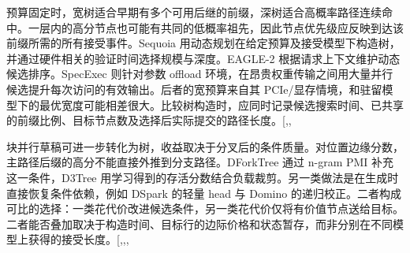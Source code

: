 \documentclass[
  a4paper,
  UTF8,
  fontset=none,
  zihao=5]{ctexart}
\begin{document}
预算固定时，宽树适合早期有多个可用后继的前缀，深树适合高概率路径连续命中。一层内的高分节点也可能有共同的低概率祖先，因此节点优先级应反映到达该前缀所需的所有接受事件。Sequoia
用动态规划在给定预算及接受模型下构造树，并通过硬件相关的验证时间选择规模与深度。EAGLE-2
根据请求上下文维护动态候选排序。SpecExec 则针对参数 offload
环境，在昂贵权重传输之间用大量并行候选提升每次访问的有效输出。后者的宽预算来自其
PCIe/显存情境，和驻留模型下的最优宽度可能相差很大。比较树构造时，应同时记录候选搜索时间、已共享的前缀比例、目标节点数及选择后实际提交的路径长度。{[},,\citeproc{ref-specexec}{52}{]}

块并行草稿可进一步转化为树，收益取决于分叉后的条件质量。对位置边缘分数，主路径后缀的高分不能直接外推到分支路径。DForkTree
通过 n-gram PMI 补充这一条件，D3Tree
用学习得到的存活分数结合负载裁剪。另一类做法是在生成时直接恢复条件依赖，例如
DSpark 的轻量 head 与 Domino
的递归校正。二者构成可比的选择：一类花代价改进候选条件，另一类花代价仅将有价值节点送给目标。二者能否叠加取决于构造时间、目标行的边际价格和状态暂存，而非分别在不同模型上获得的接受长度。{[},,,\citeproc{ref-d3tree}{49}{]}
\end{document}
